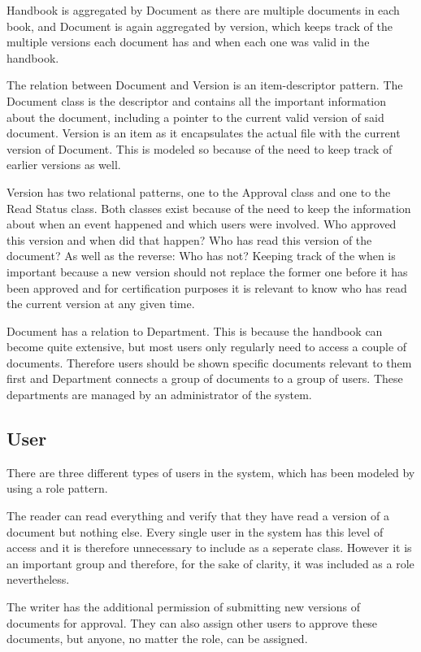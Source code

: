 Handbook is aggregated by Document as there are multiple documents in each book, and Document is again aggregated by version, which keeps track of the multiple versions each document has and when each one was valid in the handbook.

The relation between Document and Version is an item-descriptor pattern.
The Document class is the descriptor and contains all the important information about the document, including a pointer to the current valid version of said document.
Version is an item as it encapsulates the actual file with the current version of Document.
This is modeled so because of the need to keep track of earlier versions as well.

Version has two relational patterns, one to the Approval class and one to the Read Status class.
Both classes exist because of the need to keep the information about when an event happened and which users were involved.
Who approved this version and when did that happen?
Who has read this version of the document?
As well as the reverse: Who has not?
Keeping track of the when is important because a new version should not replace the former one before it has been approved and for certification purposes it is relevant to know who has read the current version at any given time.

Document has a relation to Department.
This is because the handbook can become quite extensive, but most users only regularly need to access a couple of documents.
Therefore users should be shown specific documents relevant to them first and Department connects a group of documents to a group of users.
These departments are managed by an administrator of the system.

\subsection{User}
There are three different types of users in the system, which has been modeled by using a role pattern.

The reader can read everything and verify that they have read a version of a document but nothing else.
Every single user in the system has this level of access and it is therefore unnecessary to include as a seperate class.
However it is an important group and therefore, for the sake of clarity, it was included as a role nevertheless.

The writer has the additional permission of submitting new versions of documents for approval. They can also assign other users to approve these documents, but anyone, no matter the role, can be assigned.

